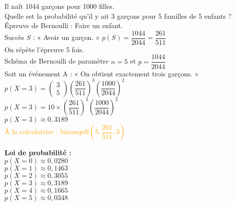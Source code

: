 Il naît 1044 garçons pour 1000 filles. \\ Quelle est la probabilité qu'il y ait 3 garçons pour 5 familles de 5 enfants ? \\

Épreuve de Bernoulli : Faire un enfant. \\

Succès $S$ : « Avoir un garçon. » $p\left(S\right) = \dfrac{1044}{2044} = \dfrac{261}{511} $ \\

On répète l'épreuve 5 fois. \\

Schéma de Bernoulli de paramètre $n = 5 $ et $p = \dfrac{1044}{2044} $ \\

Soit un événement A : « On obtient exactement trois garçons. » \\

$p\left(X = 3\right) = \left(\begin{array}{c} 3 \\ 5 \end{array}\right) \left(\dfrac{261}{511}\right)^3\left(\dfrac{1000}{2044}\right)^2$ \\

$p\left(X=3\right) = 10 \times \left(\dfrac{261}{511}\right)^3\left(\dfrac{1000}{2044}\right)^2 $ \\

$ p\left(X=3\right)  \approx 0,3189 $ \\

\textcolor{orange} {À la calculatrice : $\mathrm{binompdf} \left(5,\dfrac{261}{511},3\right)$} 

\vspace*{.3cm}

\textbf{Loi de probabilité : }\\

$p\left(X = 0\right) \approx 0,0280$ \\

$p\left(X = 1\right) \approx 0,1463$ \\

$p\left(X = 2\right) \approx 0,3055$ \\

$p\left(X = 3\right) \approx 0,3189$ \\

$p\left(X = 4\right) \approx 0,1665$ \\

$p\left(X = 5\right) \approx 0,0348$ \\

